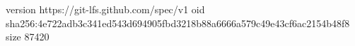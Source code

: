 version https://git-lfs.github.com/spec/v1
oid sha256:4e722adb3c341ed543d694905fbd3218b88a6666a579c49e43cf6ac2154b48f8
size 87420
